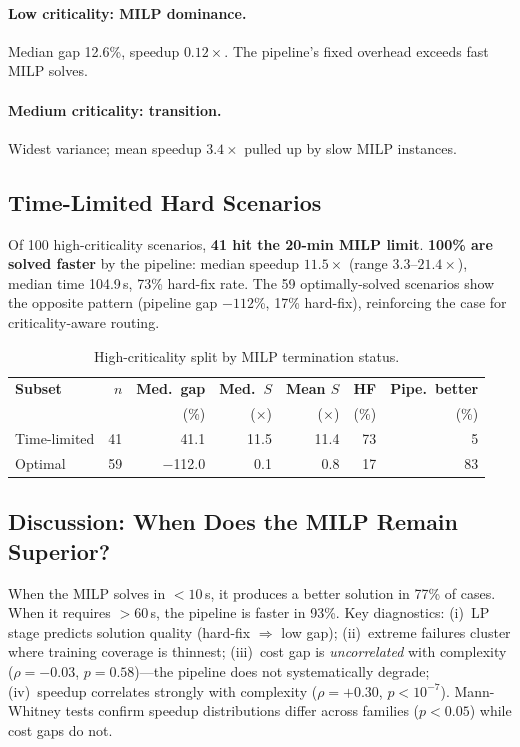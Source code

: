 \documentclass{article}
\begin{document}
\paragraph{Low criticality: MILP dominance.} Median gap 12.6\%, speedup $0.12\times$. The pipeline's fixed overhead exceeds fast MILP solves.

\paragraph{Medium criticality: transition.} Widest variance; mean speedup $3.4\times$ pulled up by slow MILP instances.

\subsection{Time-Limited Hard Scenarios}

Of 100 high-criticality scenarios, \textbf{41 hit the 20-min MILP limit}. \textbf{100\% are solved faster} by the pipeline: median speedup $11.5\times$ (range $3.3$--$21.4\times$), median time 104.9\,s, 73\% hard-fix rate. The 59 optimally-solved scenarios show the opposite pattern (pipeline gap $-112$\%, 17\% hard-fix), reinforcing the case for criticality-aware routing.

\begin{table}[htbp]
\centering\small
\begin{tabular}{lrrrrrr}
\toprule
\textbf{Subset} & $n$ & \textbf{Med.\ gap} & \textbf{Med.\ $S$} & \textbf{Mean $S$} & \textbf{HF} & \textbf{Pipe.\ better} \\
 & & (\%) & ($\times$) & ($\times$) & (\%) & (\%) \\
\midrule
Time-limited & 41 & 41.1 & 11.5 & 11.4 & 73 & 5 \\
Optimal & 59 & $-$112.0 & 0.1 & 0.8 & 17 & 83 \\
\bottomrule
\end{tabular}
\caption{High-criticality split by MILP termination status.}
\label{tab:htl_comparison}
\end{table}

\subsection{Discussion: When Does the MILP Remain Superior?}

When the MILP solves in $<10$\,s, it produces a better solution in 77\% of cases. When it requires $>60$\,s, the pipeline is faster in 93\%. Key diagnostics: (i)~LP stage predicts solution quality (hard-fix $\Rightarrow$ low gap); (ii)~extreme failures cluster where training coverage is thinnest; (iii)~cost gap is \emph{uncorrelated} with complexity ($\rho = -0.03$, $p = 0.58$)---the pipeline does not systematically degrade; (iv)~speedup correlates strongly with complexity ($\rho = +0.30$, $p < 10^{-7}$). Mann-Whitney tests confirm speedup distributions differ across families ($p < 0.05$) while cost gaps do not.
\end{document}

